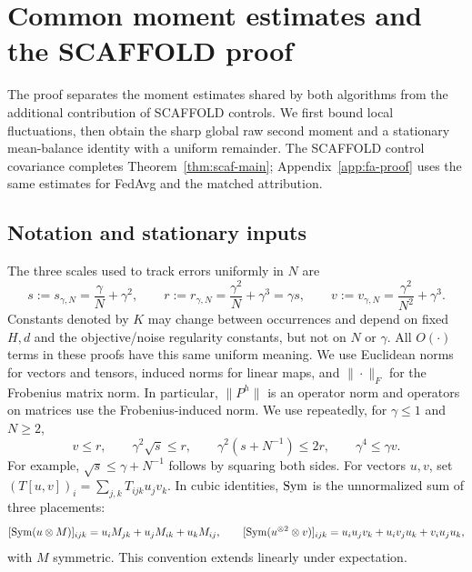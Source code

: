 \section{Common moment estimates and the SCAFFOLD proof}
\label{app:scaf-proof}

The proof separates the moment estimates shared by both algorithms from the
additional contribution of SCAFFOLD controls. We first bound local fluctuations,
then obtain the sharp global raw second moment and a stationary mean-balance identity
with a uniform remainder. The SCAFFOLD control covariance completes
Theorem~\ref{thm:scaf-main}; Appendix~\ref{app:fa-proof} uses the same
estimates for FedAvg and the matched attribution.

\subsection{Notation and stationary inputs}
\label{app:proof-notation}
\label{app:common-inputs}

The three scales used to track errors uniformly in $N$ are
\begin{equation}
\label{eq:scales}
 s:=s_{\gamma,N}=\frac{\gamma}{N}+\gamma^2,\qquad
 r:=r_{\gamma,N}=\frac{\gamma^2}{N}+\gamma^3=\gamma s,\qquad
 v:=v_{\gamma,N}=\frac{\gamma^2}{N^2}+\gamma^3.
\end{equation}
Constants denoted by $K$ may change between occurrences and depend on fixed
$H,d$ and the objective/noise regularity constants, but not on $N$ or $\gamma$.
All $O(\cdot)$ terms in these proofs have this same uniform meaning.
We use Euclidean norms for vectors and tensors, induced norms for linear
maps, and $\|\cdot\|_F$ for the Frobenius matrix norm. In particular,
$\|P^h\|$ is an operator norm and operators on matrices use the
Frobenius-induced norm. We use repeatedly, for
$\gamma\le1$ and $N\ge2$,
\begin{equation}
\label{eq:common-scale-comparisons}
 v\le r,\qquad \gamma^2\sqrt{s}\le r,\qquad
 \gamma^2(s+N^{-1})\le2r,\qquad \gamma^4\le\gamma v.
\end{equation}
For example, $\sqrt{s}\le\gamma+N^{-1}$ follows by squaring both sides.
For vectors $u,v$, set $(T[u,v])_i=\sum_{j,k}T_{ijk}u_jv_k$.
In cubic identities, $\operatorname{Sym}$ is the unnormalized sum of three placements:
\[
 [\operatorname{Sym}(u\otimes M)]_{ijk}=u_iM_{jk}+u_jM_{ik}+u_kM_{ij},\qquad
 [\operatorname{Sym}(u^{\otimes2}\otimes v)]_{ijk}
 =u_iu_jv_k+u_iv_ju_k+v_iu_ju_k,
\]
with $M$ symmetric. This convention extends linearly under expectation.


